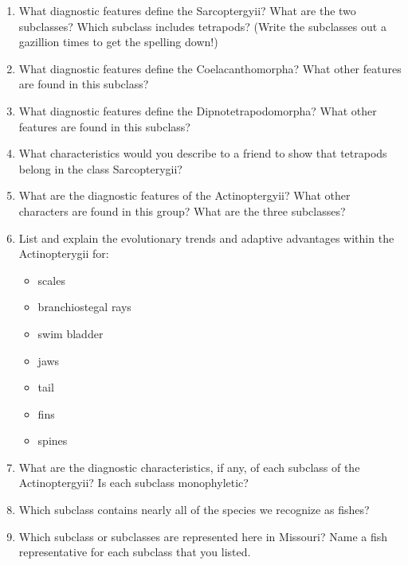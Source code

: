 \documentclass[letterpaper]{tufte-handout}
\begin{document}
\begin{enumerate}
	\item What diagnostic features define the Sarcoptergyii?  What are the two subclasses?  Which subclass includes tetrapods?  (Write the subclasses out a gazillion times to get the spelling down!)

	\item What diagnostic features define the Coelacanthomorpha?  What other features are found in this subclass?

	\item What diagnostic features define the Dipnotetrapodomorpha?  What other features are found in this subclass?

	\item What characteristics would you describe to a friend to show that tetrapods belong in the class Sarcopterygii?

	\item What are the diagnostic features of the Actinoptergyii?  What other characters are found in this group?  What are the three subclasses?  

	\item List and explain the evolutionary trends and adaptive advantages within the Actinopterygii for:
	\begin{itemize}
		\item scales
		\item branchiostegal rays
		\item swim bladder
		\item jaws
		\item tail
		\item fins
		\item spines
	\end{itemize}

	\item What are the diagnostic characteristics, if any, of each subclass of the Actinoptergyii?  Is each subclass monophyletic? 

	\item Which subclass contains nearly all of the species we recognize as fishes?

	\item Which subclass or subclasses are represented here in Missouri? Name a fish representative for each subclass that you listed.


\end{enumerate}
\end{document}
